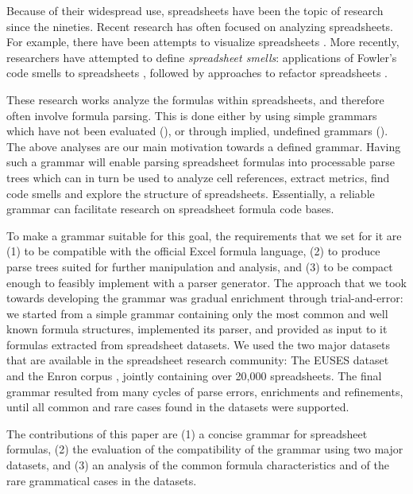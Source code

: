 \documentclass[conference]{IEEEtran}
\begin{document}
Because of their widespread use, spreadsheets have been the topic of research since the nineties\cite{DBLP:journals/sigplan/BellP93}. Recent research has often focused on analyzing spreadsheets. For example, there have been attempts to visualize spreadsheets \cite{DBLP:conf/icse/HermansPD11, Shio1999}. More recently, researchers have attempted to define \emph{spreadsheet smells}: applications of Fowler's code smells to spreadsheets \cite{DBLP:conf/icse/HermansPD12, DBLP:conf/icsm/Hermans212}, followed by approaches to refactor spreadsheets \cite{hermans2014bumblebee,badame2012refactoring}.

These research works analyze the formulas within spreadsheets, and therefore often involve formula parsing. This is done either by using simple grammars which have not been evaluated (\cite{badame2012refactoring}), or through implied, undefined grammars (\cite{DBLP:conf/icse/HermansPD11,DBLP:conf/icse/HermansPD12, DBLP:conf/icsm/Hermans212, hermans2014bumblebee}). The above analyses are our main motivation towards a defined grammar. Having such a grammar will enable parsing spreadsheet formulas into processable parse trees which can in turn be used to analyze cell references, extract metrics, find code smells and explore the structure of spreadsheets. Essentially, a reliable grammar can facilitate research on spreadsheet formula code bases.

To make a grammar suitable for this goal, the requirements that we set for it are (1) to be compatible with the official Excel formula language, (2) to produce parse trees suited for further manipulation and analysis, and (3) to be compact enough to feasibly implement with a parser generator. The approach that we took towards developing the grammar was gradual enrichment through trial-and-error: we started from a simple grammar containing only the most common and well known formula structures, implemented its parser, and provided as input to it formulas extracted from spreadsheet datasets. We used the two major datasets that are available in the spreadsheet research community: The EUSES dataset \cite{euses} and the Enron corpus \cite{enron}, jointly containing over 20,000 spreadsheets. The final grammar resulted from many cycles of parse errors, enrichments and refinements, until all common and rare cases found in the datasets were supported.

The contributions of this paper are (1) a concise grammar for spreadsheet formulas, (2) the evaluation of the compatibility of the grammar using two major datasets, and (3) an analysis of the common formula characteristics and of the rare grammatical cases in the datasets.
\end{document}
